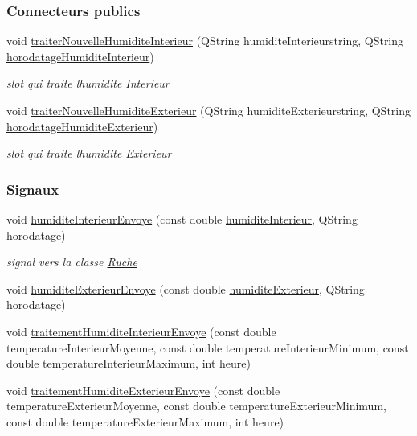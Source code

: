 \subsubsection*{Connecteurs publics}
\begin{DoxyCompactItemize}
\item 
void \hyperlink{class_infos_humidite_a0995d68a036f73df3b5a86e5538104bd}{traiter\+Nouvelle\+Humidite\+Interieur} (Q\+String humidite\+Interieurstring, Q\+String \hyperlink{class_infos_humidite_a38712bac5a2d4d106a016647ad39fedf}{horodatage\+Humidite\+Interieur})
\begin{DoxyCompactList}\small\item\em slot qui traite l\textquotesingle{}humidite Interieur \end{DoxyCompactList}\item 
void \hyperlink{class_infos_humidite_a8d17fa3c7d15b1ff8130ae5d22702e5f}{traiter\+Nouvelle\+Humidite\+Exterieur} (Q\+String humidite\+Exterieurstring, Q\+String \hyperlink{class_infos_humidite_aa08b4f342e83f8ad437a8272698bb512}{horodatage\+Humidite\+Exterieur})
\begin{DoxyCompactList}\small\item\em slot qui traite l\textquotesingle{}humidite Exterieur \end{DoxyCompactList}\end{DoxyCompactItemize}
\subsubsection*{Signaux}
\begin{DoxyCompactItemize}
\item 
void \hyperlink{class_infos_humidite_aa0eb7d8a609b837e1b450b7d79e1ff81}{humidite\+Interieur\+Envoye} (const double \hyperlink{class_infos_humidite_ad2847e671ad0b90f8dc0940dee107c38}{humidite\+Interieur}, Q\+String horodatage)
\begin{DoxyCompactList}\small\item\em signal vers la classe \hyperlink{class_ruche}{Ruche} \end{DoxyCompactList}\item 
void \hyperlink{class_infos_humidite_a666d4bd12639460ea0fd2a3f483c2842}{humidite\+Exterieur\+Envoye} (const double \hyperlink{class_infos_humidite_a503a9c849508928d3046292f17f37230}{humidite\+Exterieur}, Q\+String horodatage)
\item 
void \hyperlink{class_infos_humidite_a3643afa07ff3ac73a4190d77ce230d3b}{traitement\+Humidite\+Interieur\+Envoye} (const double temperature\+Interieur\+Moyenne, const double temperature\+Interieur\+Minimum, const double temperature\+Interieur\+Maximum, int heure)
\item 
void \hyperlink{class_infos_humidite_abd0535dee74a4588232d282d0fe64829}{traitement\+Humidite\+Exterieur\+Envoye} (const double temperature\+Exterieur\+Moyenne, const double temperature\+Exterieur\+Minimum, const double temperature\+Exterieur\+Maximum, int heure)
\end{DoxyCompactItemize}
